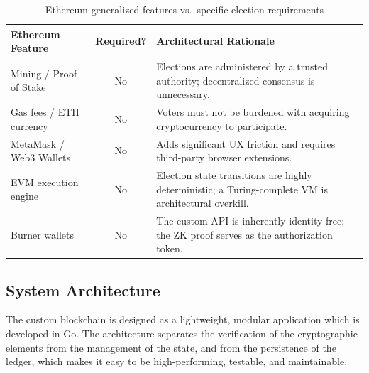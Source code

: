 \documentclass[12pt, a4paper]{report}
\begin{document}
\begin{table}[H]
\centering
\caption{Ethereum generalized features vs.\ specific election requirements}
\label{tab:eth_overhead}
\begin{tabular}{|l|c|p{8cm}|}
\hline
\textbf{Ethereum Feature} & \textbf{Required?} & \textbf{Architectural Rationale} \\ \hline
Mining / Proof of Stake & No & Elections are administered by a trusted authority; decentralized consensus is unnecessary. \\ \hline
Gas fees / ETH currency & No & Voters must not be burdened with acquiring cryptocurrency to participate. \\ \hline
MetaMask / Web3 Wallets & No & Adds significant UX friction and requires third-party browser extensions. \\ \hline
EVM execution engine & No & Election state transitions are highly deterministic; a Turing-complete VM is architectural overkill. \\ \hline
Burner wallets & No & The custom API is inherently identity-free; the ZK proof serves as the authorization token. \\ \hline
\end{tabular}
\end{table}

\subsection{System Architecture}

The custom blockchain is designed as a lightweight, modular application which is developed in Go. The architecture separates the verification of the cryptographic elements from the management of the state, and from the persistence of the ledger, which makes it easy to be high-performing, testable, and maintainable.
\end{document}
